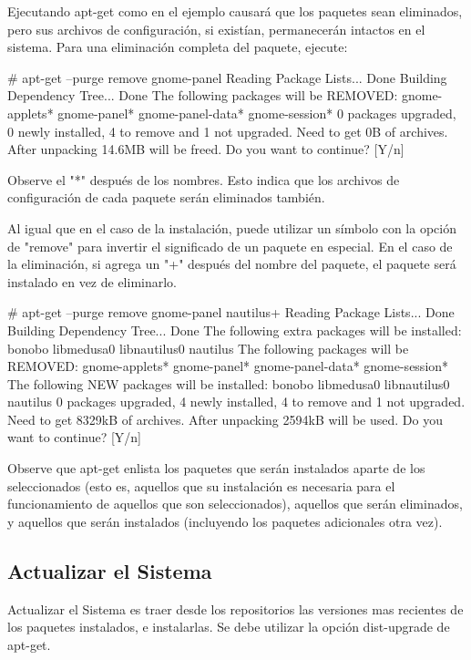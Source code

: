 \documentclass[12pt]{article}
\begin{document}
Ejecutando apt-get como en el ejemplo causará que los paquetes sean eliminados, pero sus archivos de configuración, si existían, permanecerán intactos en el sistema. Para una eliminación completa del paquete, ejecute:

     # apt-get --purge remove gnome-panel
     Reading Package Lists... Done
     Building Dependency Tree... Done
     The following packages will be REMOVED:
       gnome-applets* gnome-panel* gnome-panel-data* gnome-session*
     0 packages upgraded, 0 newly installed, 4 to remove and 1 not upgraded.
     Need to get 0B of archives. After unpacking 14.6MB will be freed.
     Do you want to continue? [Y/n]

Observe el "*" después de los nombres. Esto indica que los archivos de configuración de cada paquete serán eliminados también.

Al igual que en el caso de la instalación, puede utilizar un símbolo con la opción de "remove" para invertir el significado de un paquete en especial. En el caso de la eliminación, si agrega un "+" después del nombre del paquete, el paquete será instalado en vez de eliminarlo.

     # apt-get --purge remove gnome-panel nautilus+
     Reading Package Lists... Done
     Building Dependency Tree... Done
     The following extra packages will be installed:
       bonobo libmedusa0 libnautilus0 nautilus
     The following packages will be REMOVED:
       gnome-applets* gnome-panel* gnome-panel-data* gnome-session*
     The following NEW packages will be installed:
       bonobo libmedusa0 libnautilus0 nautilus
     0 packages upgraded, 4 newly installed, 4 to remove and 1 not upgraded.
     Need to get 8329kB of archives. After unpacking 2594kB will be used.
     Do you want to continue? [Y/n]

Observe que apt-get enlista los paquetes que serán instalados aparte de los seleccionados (esto es, aquellos que su instalación es necesaria para el funcionamiento de aquellos que son seleccionados), aquellos que serán eliminados, y aquellos que serán instalados (incluyendo los paquetes adicionales otra vez).

\subsection*{Actualizar el Sistema}

Actualizar el Sistema es traer desde los repositorios las versiones mas recientes de los paquetes instalados,
e instalarlas. Se debe utilizar la opción dist-upgrade de apt-get.
\end{document}

